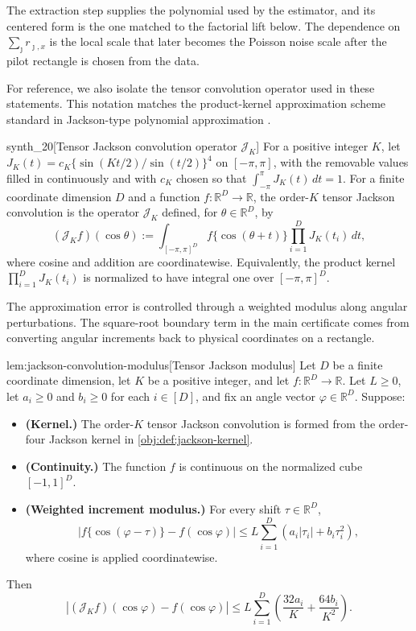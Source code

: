 The extraction step supplies the polynomial used by the estimator, and its centered form is the one matched to the factorial lift below. The dependence on \(\sum_{\jmath}r_{\jmath,x}\) is the local scale that later becomes the Poisson noise scale after the pilot rectangle is chosen from the data.

For reference, we also isolate the tensor convolution operator used in these statements. This notation matches the product-kernel approximation scheme standard in Jackson-type polynomial approximation \citep{DeVore1993}.

\begin{definitionv}{synth_20}[Tensor Jackson convolution operator $\mathcal J_K$]
For a positive integer $K$, let $J_K(t)=c_K\{\sin(Kt/2)/\sin(t/2)\}^4$ on $[-\pi,\pi]$, with the removable values filled in continuously and with $c_K$ chosen so that $\int_{-\pi}^{\pi}J_K(t)\,dt=1$. For a finite coordinate dimension $D$ and a function $f:\mathbb R^D\to\mathbb R$, the order-$K$ tensor Jackson convolution is the operator $\mathcal J_K$ defined, for $\theta\in\mathbb R^D$, by \[ (\mathcal J_K f)(\cos\theta) := \int_{[-\pi,\pi]^D} f\{\cos(\theta+t)\}\prod_{i=1}^D J_K(t_i)\,dt, \] where cosine and addition are coordinatewise. Equivalently, the product kernel $\prod_{i=1}^D J_K(t_i)$ is normalized to have integral one over $[-\pi,\pi]^D$.
\end{definitionv}

The approximation error is controlled through a weighted modulus along angular perturbations. The square-root boundary term in the main certificate comes from converting angular increments back to physical coordinates on a rectangle.

\begin{lemmav}{lem:jackson-convolution-modulus}[Tensor Jackson modulus]
Let \(D\) be a finite coordinate dimension, let \(K\) be a positive integer, and let \(f:\mathbb R^D\to\mathbb R\). Let \(L\ge0\), let \(a_i\ge0\) and \(b_i\ge0\) for each \(i\in[D]\), and fix an angle vector \(\varphi\in\mathbb R^D\). Suppose:
\begin{itemize}
\item \textbf{(Kernel.)} The order-\(K\) tensor Jackson convolution is formed from the order-four Jackson kernel in \cref{obj:def:jackson-kernel}.
\item \textbf{(Continuity.)} The function \(f\) is continuous on the normalized cube \([-1,1]^D\).
\item \textbf{(Weighted increment modulus.)} For every shift \(\tau\in\mathbb R^D\),
\[
\left|f\{\cos(\varphi-\tau)\}-f(\cos\varphi)\right|
\le
L\sum_{i=1}^D\left(a_i|\tau_i|+b_i\tau_i^2\right),
\]
where cosine is applied coordinatewise.
\end{itemize}
Then
\[
\left|(\mathcal J_K f)(\cos\varphi)-f(\cos\varphi)\right|
\le
L\sum_{i=1}^D\left(\frac{32a_i}{K}+\frac{64b_i}{K^2}\right).
\]
\end{lemmav}

